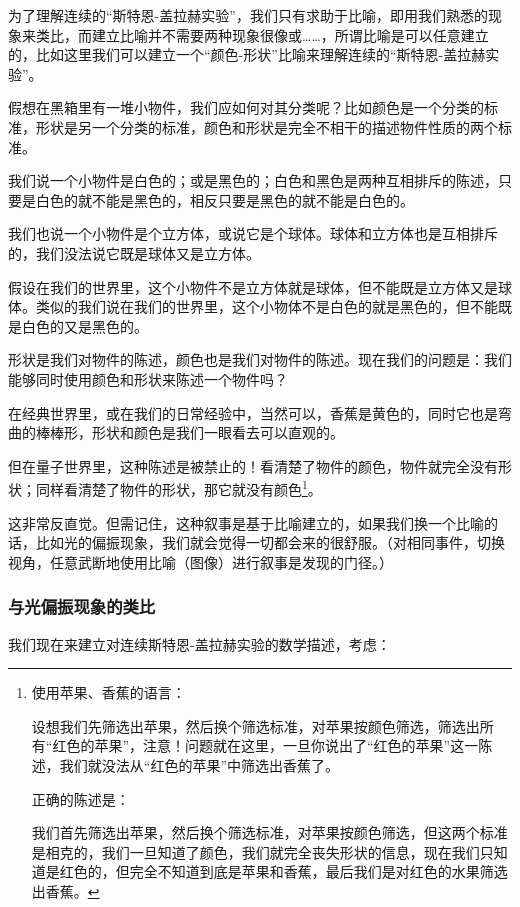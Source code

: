 
为了理解连续的“斯特恩-盖拉赫实验”，我们只有求助于比喻，即用我们熟悉的现象来类比，而建立比喻并不需要两种现象很像或……，所谓比喻是可以任意建立的，比如这里我们可以建立一个“颜色-形状”比喻来理解连续的“斯特恩-盖拉赫实验”。

假想在黑箱里有一堆小物件，我们应如何对其分类呢？比如颜色是一个分类的标准，形状是另一个分类的标准，颜色和形状是完全不相干的描述物件性质的两个标准。

我们说一个小物件是白色的；或是黑色的；白色和黑色是两种互相排斥的陈述，只要是白色的就不能是黑色的，相反只要是黑色的就不能是白色的。

我们也说一个小物件是个立方体，或说它是个球体。球体和立方体也是互相排斥的，我们没法说它既是球体又是立方体。

假设在我们的世界里，这个小物件不是立方体就是球体，但不能既是立方体又是球体。类似的我们说在我们的世界里，这个小物体不是白色的就是黑色的，但不能既是白色的又是黑色的。

形状是我们对物件的陈述，颜色也是我们对物件的陈述。现在我们的问题是：我们能够同时使用颜色和形状来陈述一个物件吗？

在经典世界里，或在我们的日常经验中，当然可以，香蕉是黄色的，同时它也是弯曲的棒棒形，形状和颜色是我们一眼看去可以直观的。

但在量子世界里，这种陈述是被禁止的！看清楚了物件的颜色，物件就完全没有形状；同样看清楚了物件的形状，那它就没有颜色\footnote{使用苹果、香蕉的语言：

设想我们先筛选出苹果，然后换个筛选标准，对苹果按颜色筛选，筛选出所有“红色的苹果”，注意！问题就在这里，一旦你说出了“红色的苹果”这一陈述，我们就没法从“红色的苹果”中筛选出香蕉了。

正确的陈述是：

我们首先筛选出苹果，然后换个筛选标准，对苹果按颜色筛选，但这两个标准是相克的，我们一旦知道了颜色，我们就完全丧失形状的信息，现在我们只知道是红色的，但完全不知道到底是苹果和香蕉，最后我们是对红色的水果筛选出香蕉。}。

这非常反直觉。但需记住，这种叙事是基于比喻建立的，如果我们换一个比喻的话，比如光的偏振现象，我们就会觉得一切都会来的很舒服。（对相同事件，切换视角，任意武断地使用比喻（图像）进行叙事是发现的门径。）

\subsubsection{与光偏振现象的类比}

我们现在来建立对连续斯特恩-盖拉赫实验的数学描述，考虑：

